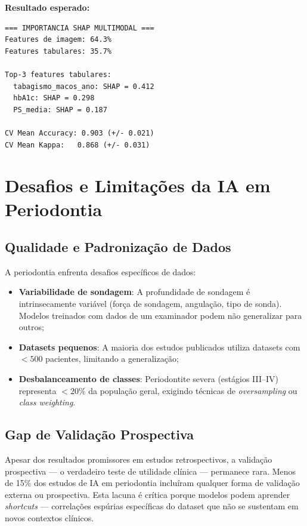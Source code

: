 \textbf{Resultado esperado:}
\begin{lstlisting}[style=saida]
=== IMPORTANCIA SHAP MULTIMODAL ===
Features de imagem: 64.3%
Features tabulares: 35.7%

Top-3 features tabulares:
  tabagismo_macos_ano: SHAP = 0.412
  hbA1c: SHAP = 0.298
  PS_media: SHAP = 0.187

CV Mean Accuracy: 0.903 (+/- 0.021)
CV Mean Kappa:   0.868 (+/- 0.031)
\end{lstlisting}


\section{Desafios e Limitações da IA em Periodontia}

\subsection{Qualidade e Padronização de Dados}

A periodontia enfrenta desafios específicos de dados:
\begin{itemize}
    \item \textbf{Variabilidade de sondagem}: A profundidade de sondagem é intrinsecamente variável (força de sondagem, angulação, tipo de sonda). Modelos treinados com dados de um examinador podem não generalizar para outros;
    \item \textbf{Datasets pequenos}: A maioria dos estudos publicados utiliza datasets com $< 500$ pacientes, limitando a generalização;
    \item \textbf{Desbalanceamento de classes}: Periodontite severa (estágios III--IV) representa $< 20\%$ da população geral, exigindo técnicas de \textit{oversampling} ou \textit{class weighting}.
\end{itemize}

\subsection{Gap de Validação Prospectiva}

Apesar dos resultados promissores em estudos retrospectivos, a validação prospectiva --- o verdadeiro teste de utilidade clínica --- permanece rara. Menos de 15\% dos estudos de IA em periodontia incluíram qualquer forma de validação externa ou prospectiva. Esta lacuna é crítica porque modelos podem aprender \textit{shortcuts} --- correlações espúrias específicas do dataset que não se sustentam em novos contextos clínicos.

